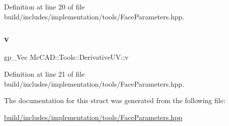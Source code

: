 Definition at line 20 of file build/includes/implementation/tools/\+Face\+Parameters.\+hpp.

\mbox{\label{structMcCAD_1_1Tools_1_1DerivativeUV_a05fb6a710031b3fb1ab8abd6e2fc691a}} 
\subsubsection{\texorpdfstring{v}{v}}
{\footnotesize\ttfamily gp\+\_\+\+Vec Mc\+C\+A\+D\+::\+Tools\+::\+Derivative\+U\+V\+::v}



Definition at line 21 of file build/includes/implementation/tools/\+Face\+Parameters.\+hpp.



The documentation for this struct was generated from the following file\+:\begin{DoxyCompactItemize}
\item 
\hyperlink{build_2includes_2implementation_2tools_2FaceParameters_8hpp}{build/includes/implementation/tools/\+Face\+Parameters.\+hpp}\end{DoxyCompactItemize}
